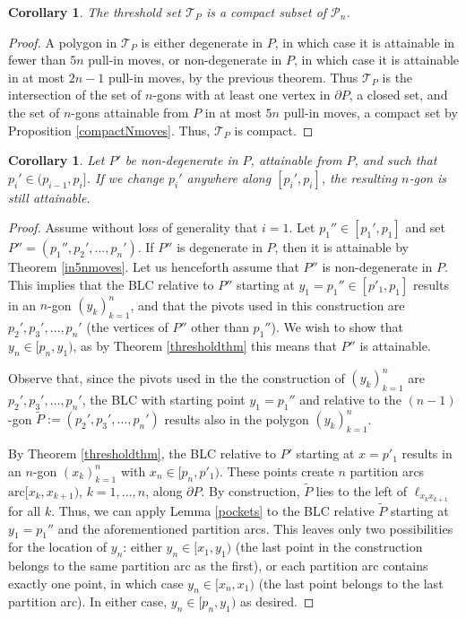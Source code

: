 \documentclass[11pt]{amsart}
\newtheorem{corollary}[theorem]{Corollary}
\theoremstyle{remark}
\numberwithin{equation}{section}
\newcommand{\PP}{\mathcal{P}}
\newcommand{\TT}{\mathcal{T}}
\newcommand{\arc}{\mathrm{arc}}
\begin{document}
\begin{corollary}\label{compactT}
The threshold set $\TT_P$ is a compact subset of $\PP_n$.
\end{corollary}
\begin{proof}
A polygon in $\TT_P$ is either degenerate in $P$, in which case it is attainable in fewer than  $5n$ pull-in moves, or non-degenerate in $P$, in which case it is attainable in at most $2n-1$ pull-in moves, by the previous theorem. Thus $\TT_P$ is the intersection of the set of $n$-gons with at least one vertex in $\partial P$, a closed set, and the set of $n$-gons attainable from $P$ in at most $5n$ pull-in moves, a compact set by Proposition \ref{compactNmoves}. Thus, $\TT_P$ is compact.
\end{proof}



\begin{corollary}\label{p1'corollary} 
Let  $P'$ be non-degenerate in $P$, attainable from $P$, and such that $p_i'\in (p_{i-1},p_i]$. If we change $p_i'$ anywhere along $[p_i',p_i]$, the resulting $n$-gon is still attainable. 
\end{corollary}

\begin{proof}
Assume without loss of generality that $i=1$. Let $p_1''\in [p_1',p_1]$ and set  
$P''=(p_1'',p_2',\ldots,p_n')$.   If $P''$ is degenerate in $P$, then it is attainable by Theorem \ref{in5nmoves}.  Let us henceforth assume that $P''$ is non-degenerate in $P$. This implies that the BLC  relative to $P''$ starting at $y_1=p_1''\in [p'_1,p_1]$ results in an $n$-gon $(y_k)_{k=1}^n$, and that the pivots used in this construction are $p_2',p_3',\ldots,p_n'$ (the vertices of $P''$ other than $p_1''$). We wish to show that $y_n\in [p_n,y_1)$, as by Theorem  \ref{thresholdthm} this means that $P''$ is attainable.

Observe that, since the pivots used in the the construction of $(y_k)_{k=1}^n$ are  $p_2',p_3',\ldots,p_n'$, the BLC  with starting point $y_1=p_1''$ and relative to the $(n-1)$-gon $\tilde P:=(p_2',p_3',\ldots,p_n')$ results also in the polygon  $(y_k)_{k=1}^n$. 

By Theorem \ref{thresholdthm}, the BLC relative to $P'$ starting at $x=p'_1$ results in an $n$-gon $(x_k)_{k=1}^n$ with $x_n\in [p_n,p'_1)$. These points create $n$ partition arcs $\arc[x_k,x_{k+1})$, $k=1,\ldots,n$, along $\partial P$. By construction, $\tilde P$ lies to the left of   $\ell_{x_kx_{k+1}}$ for all $k$. Thus, we can apply Lemma \ref{pockets} to the BLC relative $\tilde P$ starting at  $y_1=p_1''$
and the aforementioned partition arcs. This
leaves only two possibilities for the location of $y_n$: either $y_n\in [x_1,y_1)$ (the last point in the construction  belongs to the same partition arc as the first), or each partition arc contains exactly one point, in which case $y_n\in [x_n,x_1)$ (the last point belongs to the last partition arc).  In either case, $y_n\in [p_n,y_1)$ as desired.
\end{proof}
\end{document}

